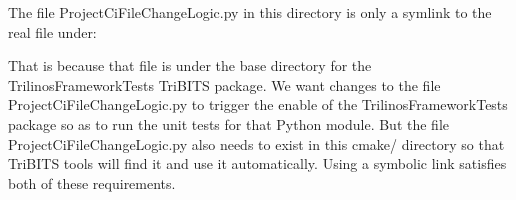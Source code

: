The file Project\+Ci\+File\+Change\+Logic.\+py in this directory is only a symlink to the real file under\+:


\begin{DoxyCode}{0}
\end{DoxyCode}


That is because that file is under the base directory for the {\ttfamily Trilinos\+Framework\+Tests} Tri\+B\+I\+TS package. We want changes to the file {\ttfamily Project\+Ci\+File\+Change\+Logic.\+py} to trigger the enable of the Trilinos\+Framework\+Tests package so as to run the unit tests for that Python module. But the file {\ttfamily Project\+Ci\+File\+Change\+Logic.\+py} also needs to exist in this {\ttfamily cmake/} directory so that Tri\+B\+I\+TS tools will find it and use it automatically. Using a symbolic link satisfies both of these requirements. 